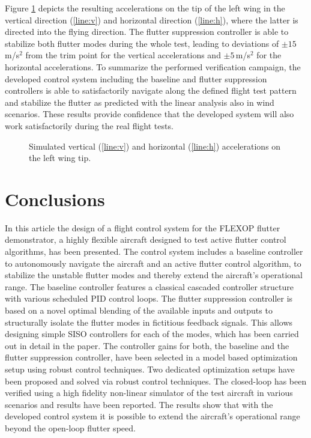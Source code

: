 \documentclass[aerospace,article,submit,moreauthors,pdftex,10pt,a4paper]{Definitions/mdpi}
\begin{document}
Figure \ref{fig:d1_patt_acc} depicts the resulting accelerations on the tip of the left wing in the vertical direction (\ref{line:v}) and horizontal direction (\ref{line:h}), where the latter is directed into the flying direction. The flutter suppression controller is able to stabilize both flutter modes during the whole test, leading to deviations of $\pm15$\,m/s$^2$ from the trim point for the vertical accelerations and $\pm5$\,m/s$^2$ for the horizontal accelerations. To summarize the performed verification campaign, the developed control system including the baseline and flutter suppression controllers is able to satisfactorily navigate along the defined flight test pattern  and stabilize the flutter as predicted with the linear analysis also in wind scenarios. These results provide confidence that the developed system will also work satisfactorily during the real flight tests.



\begin{figure}[h]
	\centering
	
	\caption{Simulated vertical (\ref{line:v}) and horizontal (\ref{line:h}) accelerations on the left wing tip.}
	\label{fig:d1_patt_acc}	
\end{figure}



\section{Conclusions}
In this article the design of a  flight control system for the FLEXOP flutter demonstrator, a highly flexible aircraft designed to test active flutter control algorithms, has been presented. The control system includes a baseline controller to autonomously navigate the aircraft and an active flutter control algorithm, to stabilize the unstable flutter modes and thereby extend the aircraft's operational range.
The baseline controller features a classical cascaded controller structure with various scheduled PID control loops. The flutter suppression controller is based on a novel optimal blending of the available inputs and outputs to structurally isolate the flutter modes in fictitious feedback signals. This allows designing simple SISO controllers for each of the modes, which has been carried out in detail in the paper. The controller gains for both, the baseline and the flutter suppression controller, have been selected in a model based optimization setup using robust control techniques. Two dedicated optimization setups have been proposed and solved via robust control techniques. The closed-loop has been verified using a high fidelity non-linear simulator of the test aircraft in various scenarios and results have been reported. The results show that with the developed control system it is possible to extend the aircraft's operational range beyond the open-loop flutter speed.
\end{document}
